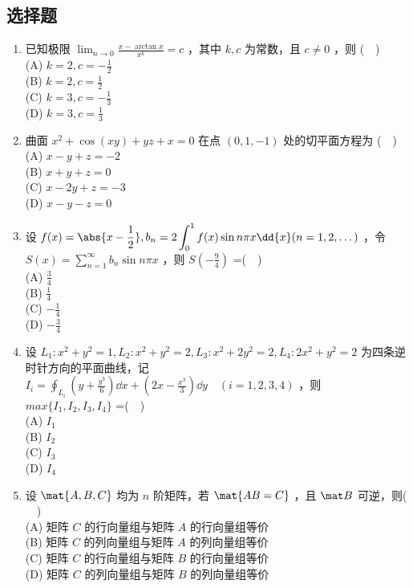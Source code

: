 
\subsection{选择题}
\begin{enumerate}
\item 已知极限 $\lim_{n\to 0}\frac{x-\arctan x}{x^k}=c$ ，其中 $k,c$ 为常数，且 $c \neq 0$ ，则 ($\quad$)\\
(A) $\displaystyle k=2,c=-\frac{1}{2}$\\
(B) $\displaystyle k=2,c=\frac{1}{2}$\\
(C) $\displaystyle k=3,c=-\frac{1}{3}$\\
(D) $\displaystyle k=3,c=\frac{1}{3}$
\item  曲面 $x^2+\cos (xy)+yz+x=0$ 在点 $(0,1,-1)$ 处的切平面方程为 ($\quad$)\\
(A) $x-y+z=-2$\\
(B) $x+y+z=0$\\
(C) $x-2y+z=-3$\\
(D)  $x-y-z=0$
\item  设 $\displaystyle f(x)=\abs{x-\frac{1}{2}},b_n=2\int_{0}^{1}f(x)\sin n\pi x\dd{x} (n=1,2,\dots)$ ，令 $\displaystyle S(x)=\sum_{n=1}^\infty b_n \sin n\pi x$ ，则 $S(-\frac{9}{4})$ =($\quad$)\\
(A) $\displaystyle \frac{3}{4}$\\
(B) $\displaystyle \frac{1}{4}$\\
(C) $\displaystyle -\frac{1}{4}$\\
(D)  $\displaystyle -\frac{3}{4}$
\item  设 $L_1:x^2+y^2=1,L_2:x^2+y^2=2,  L_3:x^2+2y^2=2, L_4:2x^2+y^2=2$  为四条逆时针方向的平面曲线，记 $\displaystyle I_i=\oint_{L_i}(y+\frac{y^3}{6})\dd{x}+(2x-\frac{x^3}{3})\dd{y}\quad (i=1,2,3,4)$  ，则 $max\{I_1,I_2,I_3,I_4\}$ =($\quad$)\\
(A) $I_1$\\
(B)  $I_2$\\
(C)  $I_3$\\
(D)  $I_4$

\item 设 $\mat {A,B,C}$ 均为 $n$ 阶矩阵，若 $\mat {AB=C}$ ，且 $\mat B$ 可逆，则($\quad$)\\
(A) 矩阵 $C$ 的行向量组与矩阵 $A$ 的行向量组等价\\
(B) 矩阵 $C$ 的列向量组与矩阵 $A$ 的列向量组等价\\
(C) 矩阵 $C$ 的行向量组与矩阵 $B$ 的行向量组等价\\
(D) 矩阵 $C$ 的列向量组与矩阵 $B$ 的列向量组等价


\end{enumerate}
